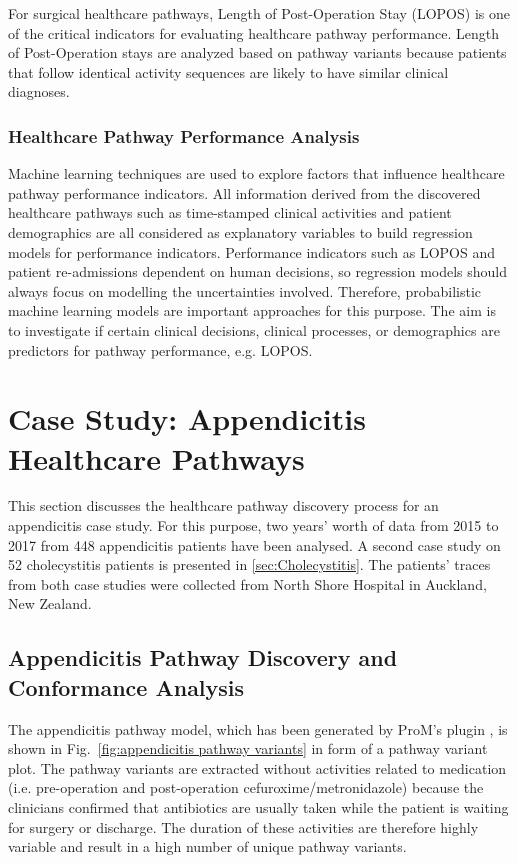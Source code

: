 For surgical healthcare pathways, Length of Post-Operation Stay (LOPOS) is one of the critical indicators for evaluating healthcare pathway performance. Length of Post-Operation stays are analyzed based on pathway variants because patients that follow identical activity sequences are likely to have similar clinical diagnoses. 

\subsubsection{Healthcare Pathway Performance Analysis}
Machine learning techniques are used to explore factors that influence healthcare pathway performance indicators. All information derived from the discovered healthcare pathways such as time-stamped clinical activities and patient demographics are all considered as explanatory variables to build regression models for performance indicators. Performance indicators such as LOPOS and patient re-admissions dependent on human decisions, so regression models should always focus on modelling the uncertainties involved. 
Therefore, probabilistic machine learning models are important approaches for this purpose.  The aim is to investigate if certain clinical decisions, clinical processes, or demographics are predictors for  pathway performance, e.g. LOPOS.

\section{Case Study: Appendicitis Healthcare Pathways}
This section discusses the healthcare pathway discovery process for an appendicitis case study. For this purpose, two years’ worth of data from 2015 to 2017 from 448 appendicitis patients have been analysed. 
A second case study on 52 cholecystitis patients is presented in \ref{sec:Cholecystitis}.
The patients' traces from both case studies were collected from North Shore Hospital in Auckland, New Zealand.

\subsection{Appendicitis Pathway Discovery and Conformance Analysis}
The appendicitis pathway model, which has been generated by ProM's
plugin , is shown in
Fig.~\ref{fig:appendicitis pathway variants} in form of a pathway
variant plot.
The pathway variants are extracted without activities related to medication (i.e. pre-operation and post-operation cefuroxime/metronidazole) because the clinicians confirmed that antibiotics are usually taken while the patient is waiting for surgery or discharge. The duration of these activities are therefore highly variable and result in a high number of unique pathway variants.

